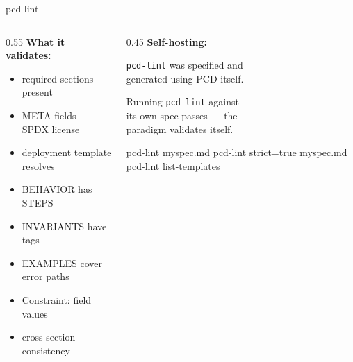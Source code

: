\documentclass[
  10pt,
  ignorenonframetext,
  aspectratio=169,
  10pt]{beamer}
\newenvironment{Shaded}{}{}
\newcommand{\ExtensionTok}[1]{#1}
\newcommand{\NormalTok}[1]{#1}
\providecommand{\tightlist}{%
  \setlength{\itemsep}{0pt}\setlength{\parskip}{0pt}}
\begin{document}
\begin{frame}[fragile]{pcd-lint}
\protect\hypertarget{pcd-lint}{}
\begin{columns}[T]
\begin{column}{0.55\textwidth}
\textbf{What it validates:}

\begin{itemize}
\tightlist
\item
  required sections present
\item
  META fields + SPDX license
\item
  deployment template resolves
\item
  BEHAVIOR has STEPS
\item
  INVARIANTS have tags
\item
  EXAMPLES cover error paths
\item
  Constraint: field values
\item
  cross-section consistency
\end{itemize}
\end{column}

\begin{column}{0.45\textwidth}
\textbf{Self-hosting:}

\texttt{pcd-lint} was specified and\\
generated using PCD itself.

\bigskip

Running \texttt{pcd-lint} against\\
its own spec passes --- the\\
paradigm validates itself.

\bigskip

\begin{Shaded}
\begin{Highlighting}[]
\ExtensionTok{pcd{-}lint}\NormalTok{ myspec.md}
\ExtensionTok{pcd{-}lint}\NormalTok{ strict=true myspec.md}
\ExtensionTok{pcd{-}lint}\NormalTok{ list{-}templates}
\end{Highlighting}
\end{Shaded}
\end{column}
\end{columns}
\end{frame}
\end{document}
